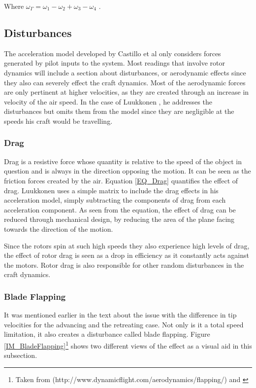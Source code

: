 Where $\omega_\Gamma = \omega_1 - \omega_2 + \omega_3 - \omega_4$ \cite{Luukkonen}.

\subsection{Disturbances}
The acceleration model developed by Castillo et al \cite{MiniFlying} only considers forces generated by pilot inputs to the system. Most readings that involve rotor dynamics will include a section about disturbances, or aerodynamic effects \cite{Hoffmann, Pounds2006, Luukkonen, NearWall} since they also can severely effect the craft dynamics. Most of the aerodynamic forces are only pertinent at higher velocities, as they are created through an increase in velocity of the air speed. In the case of Luukkonen \cite{Luukkonen}, he addresses the disturbances but omits them from the model since they are negligible at the speeds his craft would be travelling.

\subsubsection{Drag}
Drag is a resistive force whose quantity is relative to the speed of the object in question and is always in the direction opposing the motion. It can be seen as the friction forces created by the air. Equation \ref{EQ_Drag} quantifies the effect of drag. Luukkonen \cite{Luukkonen} uses a simple matrix to include the drag effects in his acceleration model, simply subtracting the components of drag from each acceleration component. As seen from the equation, the effect of drag can be reduced through mechanical design, by reducing the area of the plane facing towards the direction of the motion. 

Since the rotors spin at such high speeds they also experience high levels of drag, the effect of rotor drag is seen as a drop in efficiency as it constantly acts against the motors. Rotor drag is also responsible for other random disturbances in the craft dynamics.

\subsubsection{Blade Flapping}
It was mentioned earlier in the text about the issue with the difference in tip velocities for the advancing and the retreating case. Not only is it a total speed limitation, it also creates a disturbance called blade flapping. Figure \ref{IM_BladeFlapping}\footnote{Taken from (http://www.dynamicflight.com/aerodynamics/flapping/) and \cite{Hoffmann}} shows two different views of the effect as a visual aid in this subsection. 

